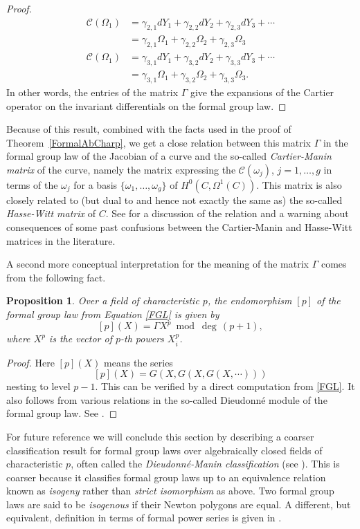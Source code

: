 \documentclass[12pt]{amsart}
\theoremstyle{theorem}
\newtheorem{prop}{Proposition}
\begin{document}
\begin{proof}
\begin{align}
\mathcal{C}(\Omega_1) &= \gamma_{2,1} dY_1 + \gamma_{2,2} dY_2 + \gamma_{2,3} dY_3 + \cdots\\
&= \gamma_{2,1} \Omega_1 + \gamma_{2,2}\Omega_2 + \gamma_{2,3} \Omega_3\nonumber\\
\mathcal{C}(\Omega_1) &= \gamma_{3,1} dY_1+ \gamma_{3,2} dY_2+  \gamma_{3,3} dY_3 + \cdots\nonumber\\
&=  \gamma_{3,1} \Omega_1 + \gamma_{3,2}\Omega_2 + \gamma_{3,3} \Omega_3.\nonumber
\end{align}
In other words, the entries of the matrix $\Gamma$ give the expansions of the Cartier operator
on the invariant differentials on the formal group law.
 \end{proof}             
 
 Because of this result, combined with the facts used in the proof of Theorem~\ref{FormalAbCharp}, we get a close
 relation between this matrix $\Gamma$ in the formal group law of the Jacobian of a curve and the so-called
 \emph{Cartier-Manin matrix} of the curve, namely the matrix expressing the $\mathcal{C}(\omega_j)$, $j = 1, \ldots, g$ 
 in terms of the $\omega_j$ for a basis $\{\omega_1, \ldots, \omega_g\}$ of $H^0(C, \Omega^1(C))$.
 This matrix is also closely related to (but dual to and hence not exactly the same as) the so-called \emph{Hasse-Witt matrix} of $C$.
 See \cite{AchterHowe} for a discussion of the relation and a warning about consequences of some past
 confusions between the Cartier-Manin and Hasse-Witt matrices in the literature.
 
 A second more conceptual interpretation for the meaning of the matrix $\Gamma$ comes from the following
 fact.
 
 \begin{prop}
 \label{pEndo}
 Over a field of characteristic $p$, the endomorphism $[p]$ of the formal group law from Equation \eqref{FGL} is given by 
 $$[p](X) = \Gamma X^p \bmod \deg\, (p + 1),$$
where $X^p$ is the vector of $p$-th powers $X_i^p$.
\end{prop}

\begin{proof}
Here $[p](X)$ means the series
$$[p](X) = G(X,G(X,G(X, \cdots )))$$
nesting to level $p-1$.  This can be verified by a direct computation from \eqref{FGL}.  It also follows from various 
relations in the so-called Dieudonn\'e module of the formal group law.  See \cite{H}.
\end{proof}

For future reference we will conclude this section by describing a coarser classification result for formal group laws
over algebraically closed fields of characteristic $p$, often called the \emph{Dieudonn\'e-Manin classification} (see \cite{O}).  
This is coarser because it classifies formal group laws up to an equivalence relation 
known as \emph{isogeny} rather than \emph{strict isomorphism} as above.   Two formal group laws are said
to be \emph{isogenous} if their Newton polygons are equal.  A different, but equivalent, definition in terms
of formal power series is given in \cite[(28.3.4)]{H}.  
\end{document}
